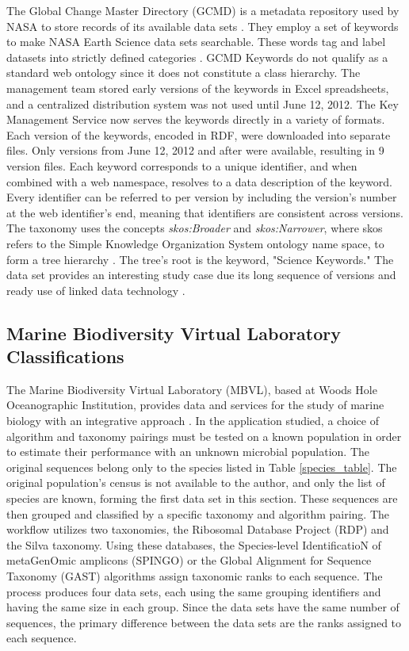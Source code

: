 The Global Change Master Directory (GCMD) is a metadata repository used by NASA to store records of its available data sets \cite{Miled:2001:GCM:372202.372324}.
They employ a set of keywords to make NASA Earth Science data sets searchable.
These words tag and label datasets into strictly defined categories \cite{GCMDKey}.
GCMD Keywords do not qualify as a standard web ontology since it does not constitute a class hierarchy.
The management team stored early versions of the keywords in Excel spreadsheets, and a centralized distribution system was not used until June 12, 2012.
The Key Management Service now serves the keywords directly in a variety of formats.
Each version of the keywords, encoded in RDF, were downloaded into separate files.
Only versions from June 12, 2012 and after were available, resulting in 9 version files.
Each keyword corresponds to a unique identifier, and when combined with a web namespace, resolves to a data description of the keyword.
Every identifier can be referred to per version by including the version's number at the web identifier's end, meaning that identifiers are consistent across versions.
The taxonomy uses the concepts \textit{skos:Broader} and \textit{skos:Narrower}, where skos refers to the Simple Knowledge Organization System ontology name space, to form a tree hierarchy \cite{skos}.
The tree's root is the keyword, "Science Keywords."
The data set provides an interesting study case due its long sequence of versions and ready use of linked data technology \cite{Stevens2016}.

\subsection{Marine Biodiversity Virtual Laboratory Classifications} \label{sec:MBVL}

The Marine Biodiversity Virtual Laboratory (MBVL), based at Woods Hole Oceanographic Institution, provides data and services for the study of marine biology with an integrative approach \cite{mbvl}.
In the application studied, a choice of algorithm and taxonomy pairings must be tested on a known population in order to estimate their performance with an unknown microbial population.
The original sequences belong only to the species listed in Table \ref{species_table}.
The original population's census is not available to the author, and only the list of species are known, forming the first data set in this section.
These sequences are then grouped and classified by a specific taxonomy and algorithm pairing.
The workflow utilizes two taxonomies, the Ribosomal Database Project (RDP) and the Silva taxonomy.
Using these databases, the Species-level IdentificatioN of metaGenOmic amplicons (SPINGO) or the Global Alignment for Sequence Taxonomy (GAST) algorithms assign taxonomic ranks to each sequence.
The process produces four data sets, each using the same grouping identifiers and having the same size in each group.
Since the data sets have the same number of sequences, the primary difference between the data sets are the ranks assigned to each sequence.

